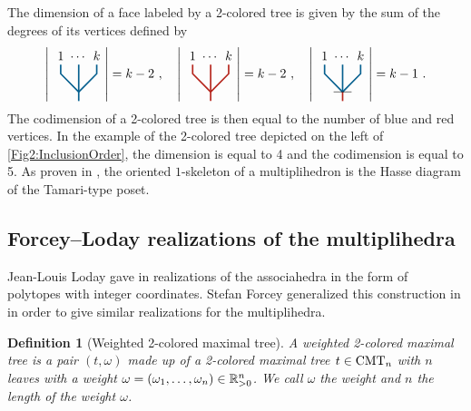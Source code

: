 \documentclass[twoside, 11pt]{amsart}
\newtheorem{definition}{Definition}[section]
\theoremstyle{remark}
\begin{document}
The dimension of a face labeled by a 2-colored tree is given by the sum of the degrees of its vertices defined by 
\[
\left|{\vcenter{\hbox{
\begin{tikzpicture}[scale=0.5]
\draw[very thick, MidnightBlue] (0,-0.5) -- (0,1.5);
\draw[very thick, MidnightBlue] (0,0) -- (-1,1)--(-1,1.5);
\draw[very thick, MidnightBlue] (0,0) -- (1,1)--(1,1.5);
\draw (1,1.5) node[above] {$k$};
\draw (-1,1.5) node[above] {$1$};
\draw (0,1.5) node[above] {$\cdots$};
\end{tikzpicture}}}}\right|=k-2\ , \quad 
\left|{\vcenter{\hbox{
\begin{tikzpicture}[scale=0.5]
\draw[very thick, BrickRed] (0,-0.5) -- (0,1.5);
\draw[very thick, BrickRed] (0,0) -- (-1,1)--(-1,1.5);
\draw[very thick, BrickRed] (0,0) -- (1,1)--(1,1.5);
\draw (1,1.5) node[above] {$k$};
\draw (-1,1.5) node[above] {$1$};
\draw (0,1.5) node[above] {$\cdots$};
\end{tikzpicture}}}}\right|=k-2\ , \quad 
\left|{\vcenter{\hbox{
\begin{tikzpicture}[scale=0.5]
\draw[very thick, MidnightBlue] (0,0) -- (0,1.5);
\draw[very thick, MidnightBlue] (0,0) -- (-1,1)--(-1,1.5);
\draw[very thick, MidnightBlue] (0,0) -- (1,1)--(1,1.5);
\draw[very thick, BrickRed] (0,0) -- (0,-0.5);
\draw (-0.5,0)--(0.5,0);
\draw (1,1.5) node[above] {$k$};
\draw (-1,1.5) node[above] {$1$};
\draw (0,1.5) node[above] {$\cdots$};
\end{tikzpicture}}}}\right|=k-1\ .
\]
The codimension of a 2-colored tree is then equal to the number of blue and red vertices. 
In the example of the 2-colored tree depicted on the left of \cref{Fig2:InclusionOrder}, the dimension is equal to 4 and the codimension is equal to 5. 
As proven in \cite[Proposition 117]{CP22}, the oriented $1$-skeleton of a multiplihedron is the Hasse diagram of the Tamari-type poset. 


\subsection{Forcey--Loday realizations of the multiplihedra}
Jean-Louis Loday gave in \cite{Loday04a} realizations of the associahedra in the form of polytopes with integer coordinates. 
Stefan Forcey generalized this construction in \cite{Forcey08} in order to give similar realizations for the multiplihedra. 

\begin{definition}[Weighted 2-colored maximal tree]
A \emph{weighted 2-colored maximal tree} is a pair $(t, \omega)$ made up of a 2-colored maximal tree $t\in \mathrm{CMT}_{n}$ with $n$ leaves with a weight $\omega= (\omega_1, \ldots, \omega_n) \in \mathbb{R}_{>0}^n$. 
We call $\omega$ the \emph{weight} and $n$ the \emph{length} of the weight $\omega$.
\end{definition}
\end{document}
